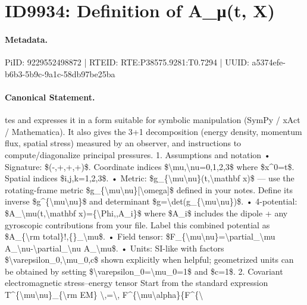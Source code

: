 \section*{ID9934: Definition of A\_μ(t, X)}
\paragraph{Metadata.}
PiID: 9229552498872 | RTEID: RTE:P38575.9281:T0.7294 | UUID: a5374efe-b6b3-5b9c-9a1c-58db97be25ba

\paragraph{Canonical Statement.}
tes and expresses it in a form suitable for symbolic manipulation (SymPy / xAct / Mathematica). It also gives the 3+1 decomposition (energy density, momentum flux, spatial stress) measured by an observer, and instructions to compute/diagonalize principal pressures. 1. Assumptions and notation • Signature: \$(-,+,+,+)\$. Coordinate indices \$\textbackslash{}mu,\textbackslash{}nu=0,1,2,3\$ where \$x\textasciicircum{}0=t\$. Spatial indices \$i,j,k=1,2,3\$. • Metric: \$g\_\{\textbackslash{}mu\textbackslash{}nu\}(t,\textbackslash{}mathbf x)\$ — use the rotating-frame metric \$g\_\{\textbackslash{}mu\textbackslash{}nu\}[\textbackslash{}omega]\$ defined in your notes. Define its inverse \$g\textasciicircum{}\{\textbackslash{}mu\textbackslash{}nu\}\$ and determinant \$g=\textbackslash{}det(g\_\{\textbackslash{}mu\textbackslash{}nu\})\$. • 4-potential: \$A\_\textbackslash{}mu(t,\textbackslash{}mathbf x)=\{\textbackslash{}Phi,,A\_i\}\$ where \$A\_i\$ includes the dipole + any gyroscopic contributions from your file. Label this combined potential as \$A\_\{\textbackslash{}rm total\}!,\{\}\_\textbackslash{}mu\$. • Field tensor: \$F\_\{\textbackslash{}mu\textbackslash{}nu\}=\textbackslash{}partial\_\textbackslash{}mu A\_\textbackslash{}nu-\textbackslash{}partial\_\textbackslash{}nu A\_\textbackslash{}mu\$. • Units: SI-like with factors \$\textbackslash{}varepsilon\_0,\textbackslash{}mu\_0,c\$ shown explicitly when helpful; geometrized units can be obtained by setting \$\textbackslash{}varepsilon\_0=\textbackslash{}mu\_0=1\$ and \$c=1\$. 2. Covariant electromagnetic stress–energy tensor Start from the standard expression T\textasciicircum{}\{\textbackslash{}mu\textbackslash{}nu\}\_\{\textbackslash{}rm EM\} \textbackslash{},=\textbackslash{}, F\textasciicircum{}\{\textbackslash{}mu\textbackslash{}alpha\}\{F\textasciicircum{}\{\textbackslash{}

